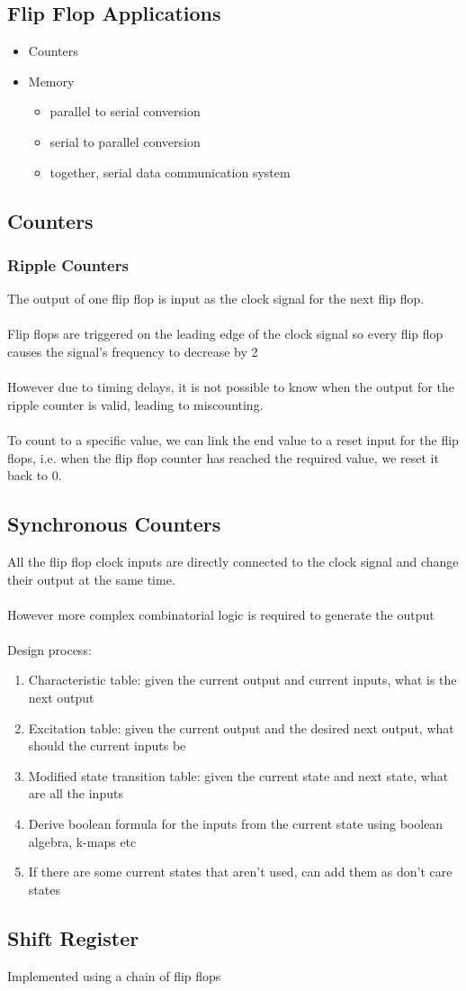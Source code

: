\documentclass[12pt,a4paper]{article} %
\begin{document}
\subsection{Flip Flop Applications}
\begin{itemize}
\item Counters
\item Memory
	\begin{itemize}
	\item parallel to serial conversion
	\item serial to parallel conversion
	\item together, serial data communication system
	\end{itemize}
\end{itemize}
\subsection{Counters}
\subsubsection{Ripple Counters}
The output of one flip flop is input as the clock signal for the next flip flop. 
\\\\
Flip flops are triggered on the leading edge of the clock signal so every flip flop causes the signal's frequency to decrease by 2
\\\\
However due to timing delays, it is not possible to know when the output for the ripple counter is valid, leading to miscounting.
\\\\
To count to a specific value, we can link the end value to a reset input for the flip flops, i.e. when the flip flop counter has reached the required value, we reset it back to 0.
\subsection{Synchronous Counters}
All the flip flop clock inputs are directly connected to the clock signal and change their output at the same time.
\\\\
However more complex combinatorial logic is required to generate the output
\\\\
Design process:
\begin{enumerate}
\item Characteristic table: given the current output and current inputs, what is the next output
\item Excitation table: given the current output and the desired next output, what should the current inputs be
\item Modified state transition table: given the current state and next state, what are all the inputs
\item Derive boolean formula for the inputs from the current state using boolean algebra, k-maps etc
\item If there are some current states that aren't used, can add them as don't care states
\end{enumerate}
\subsection{Shift Register}
Implemented using a chain of flip flops
\end{document}
